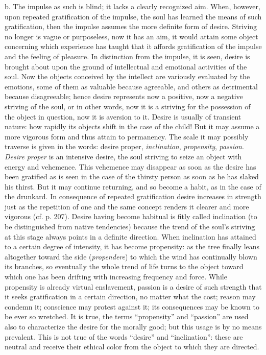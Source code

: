 b. The impulse as such is blind; it lacks a clearly recognized aim. When, however, upon repeated gratification of the impulse, the soul has learned the means of such gratification, then the impulse assumes the more definite form of desire. Striving no longer is vague or purposeless, now it has an aim, it would attain some object concerning which experience has taught that it affords gratification of the impulse and the feeling of pleasure. In distinction from the impulse, it is seen, desire
is brought about upon the ground of intellectual and emotional activities of the soul. Now the objects conceived by the intellect are variously evaluated by the emotions, some of them as valuable because agreeable, and others as detrimental because disagreeable; hence desire represents now a positive, now a negative striving of the soul, or in other words, now it is a striving for the possession of the object in question, now it is aversion to it. Desire is usually of transient nature: how rapidly its objects shift in the case of the child! But it may assume a more vigorous form and thus attain to permanency. The scale it may possibly traverse is given in the words: desire proper, \emph{inclination}, \emph{propensity}, \emph{passion}. \emph{Desire proper} is an intensive desire, the soul striving to seize an object with energy and vehemence. This vehemence may disappear as soon as the desire has been gratified as is seen in the case of the thirsty person as soon as he has slaked his thirst. But it may continue returning, and so become a habit, as in the case of the drunkard. In consequence of repeated gratification desire increases in strength just as the repetition of one and the same concept renders it clearer and more vigorous (cf. p. 207). Desire having become habitual is fitly called inclination (to be distinguished from native tendencies) because the trend of the soul's striving at this stage always points in a definite direction. When inclination has attained to a certain degree of intensity, it has become propensity: as the tree finally leans altogether toward the side (\emph{propendere}) to which the wind has continually blown its branches, so eventually the whole trend of life turns to the object toward which one has been drifting with increasing frequency and force. While propensity is already virtual enslavement, passion is a desire of such strength that it seeks gratification in a certain direction, no matter what the cost; reason may condemn it; conscience may protest against it; its consequences may be known to be ever so wretched. It is true, the terms “propensity” and “passion” are used also
to characterize the desire for the morally good; but this usage is by no means prevalent. This is not true of the words “desire” and “inclination”: these are neutral and receive their ethical color from the object to which they are directed.

